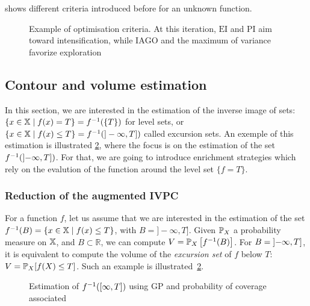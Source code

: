 \documentclass[../../Main_ManuscritThese.tex]{subfiles}
\newcommand\imgpath{/home/victor/acadwriting/Manuscrit/Text/Chapter4/img/}
\begin{document}
 shows different criteria
introduced before for an unknown function.
\begin{figure}[ht!]
  \centering
  
  \caption[Optimisation criteria for GP]{\label{fig:example_optimisation_criteria} Example of optimisation criteria. At this iteration, $\mathrm{EI}$ and $\mathrm{PI}$ aim toward intensification, while $\mathrm{IAGO}$ and the maximum of variance favorize exploration}
\end{figure}

%
\subsection{Contour and volume estimation}
\label{sec:GP_vol_estim}
In this section, we are interested in the estimation of the inverse
image of sets: $\{x \in \mathbb{X} \mid f(x) = T\}=f^{-1}(\{T\})$ for
level sets, or
$\{x\in\mathbb{X} \mid f(x) \leq T\} = f^{-1}(]-\infty, T])$ called
excursion sets. An exemple of this estimation is illustrated
\cref{fig:prob_coverage_example}, where the focus is on the estimation
of the set $f^{-1}(\interval[open left]{-\infty}{T})$. For that, we
are going to introduce enrichment strategies which rely on the
evalution of the function around the level set $\{f=T\}$.

\subsubsection{Reduction of the augmented IVPC}
For a function $f$, let us assume that we are interested in the
estimation of the set
$f^{-1}(B) = \{x \in \mathbb{X} \mid f(x) \leq T\}$, with
$B = ]-\infty, T]$. Given $\mathbb{P}_{X}$ a probability
measure on $\mathbb{X}$, and $B\subset \mathbb{R}$, we can compute
$V=\mathbb{P}_{X}\left[f^{-1}(B)\right]$. For
$B = \interval[open left]{-\infty}{T}$, it is equivalent to compute the
volume of the \emph{excursion set} of $f$ below $T$:
$V=\mathbb{P}_{X}[f(X) \leq T]$. Such an example is illustrated~\cref{fig:prob_coverage_example}.%
\begin{figure}[ht]
  \centering
  
  \caption[Estimation of $f^{-1}(B)$ using GP]{\label{fig:prob_coverage_example} Estimation of $f^{-1}(\interval{\infty}{T})$ using GP and probability of coverage associated %
  }
\end{figure}
\end{document}
